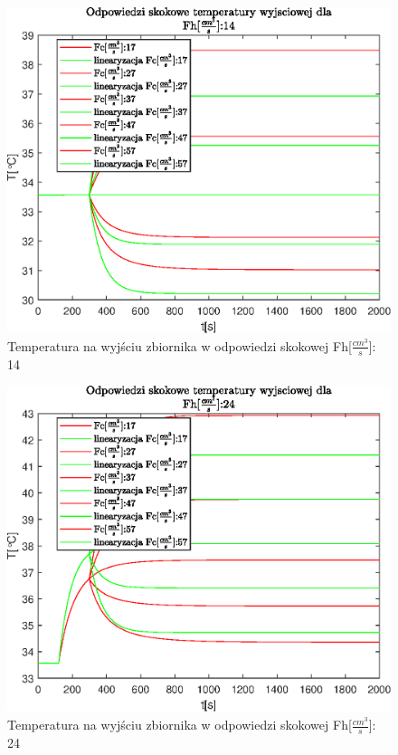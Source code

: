 \begin{figure}[h!]
   \centering
   \includegraphics{img/step-responses/Tout/stepResponseToutFh14.eps}
   \caption{Temperatura na wyjściu zbiornika w odpowiedzi skokowej Fh[$\frac{cm^3}{s}$]: 14}
   \label{fig:stepResponseToutFh14}
\end{figure}
            
\begin{figure}[h!]
   \centering
   \includegraphics{img/step-responses/Tout/stepResponseToutFh24.eps}
   \caption{Temperatura na wyjściu zbiornika w odpowiedzi skokowej Fh[$\frac{cm^3}{s}$]: 24}
   \label{fig:stepResponseToutFh24}
\end{figure}
            
